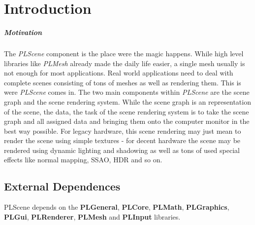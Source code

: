 \chapter{Introduction}


\paragraph{Motivation}
The \emph{PLScene} component is the place were the magic happens. While high level libraries like \emph{PLMesh} already made the daily life easier, a single mesh usually is not enough for most applications. Real world applications need to deal with complete scenes consisting of tons of meshes as well as rendering them. This is were \emph{PLScene} comes in. The two main components within \emph{PLScene} are the scene graph and the scene rendering system. While the scene graph is an representation of the scene, the data, the task of the scene rendering system is to take the scene graph and all assigned data and bringing them onto the computer monitor in the best way possible. For legacy hardware, this scene rendering may just mean to render the scene using simple textures - for decent hardware the scene may be rendered using dynamic lighting and shadowing as well as tons of used special effects like normal mapping, SSAO, HDR and so on.




\section{External Dependences}
PLScene depends on the \textbf{PLGeneral}, \textbf{PLCore}, \textbf{PLMath}, \textbf{PLGraphics}, \textbf{PLGui}, \textbf{PLRenderer}, \textbf{PLMesh} and \textbf{PLInput} libraries.
